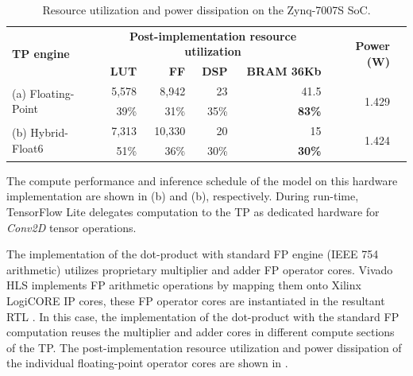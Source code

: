 \begin{table}[!h]\centering
	\caption{Resource utilization and power dissipation on the Zynq-7007S SoC.}\label{tab:resource_utilization}
	\scriptsize
	\begin{tabular}{lrrrrrr}\toprule
		\multirow{2}{*}{\textbf{TP engine}} &\multicolumn{4}{c}{\textbf{Post-implementation resource utilization}} &\multirow{2}{*}{\textbf{Power (W)}} \\\cmidrule{2-5}
		&\textbf{LUT} &\textbf{FF} &\textbf{DSP} &\textbf{BRAM 36Kb} & \\\midrule
		\multirow{2}{*}{(a) Floating-Point} &5,578 &8,942 &23 &41.5 &\multirow{2}{*}{1.429} \\
		&39\% &31\% &35\% &\textbf{83\%} & \\
		\multirow{2}{*}{(b) Hybrid-Float6} &7,313 &10,330 &20 &15 &\multirow{2}{*}{1.424} \\
		&51\% &36\% &30\% &\textbf{30\%} & \\
		\bottomrule
	\end{tabular}
\end{table}

The compute performance and inference schedule of the model on this hardware implementation are shown in (b) and (b), respectively. During run-time, TensorFlow Lite delegates computation to the TP as dedicated hardware for \emph{Conv2D} tensor operations.

The implementation of the dot-product with standard FP engine (IEEE 754 arithmetic) utilizes proprietary multiplier and adder FP operator cores. Vivado HLS implements FP arithmetic operations by mapping them onto Xilinx LogiCORE IP cores, these FP operator cores are instantiated in the resultant RTL \cite{hrica2012floating}. In this case, the implementation of the dot-product with the standard FP computation reuses the multiplier and adder cores in different compute sections of the TP. The post-implementation resource utilization and power dissipation of the individual floating-point operator cores are shown in .

